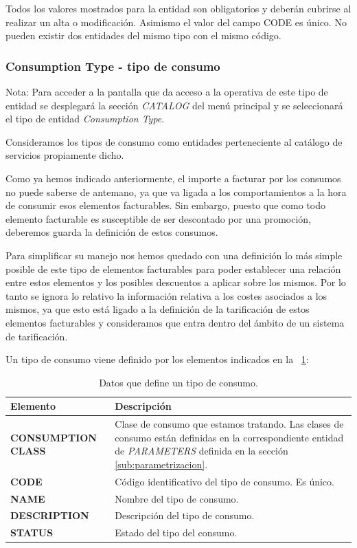 Todos los valores mostrados para la entidad son obligatorios y deberán cubrirse al realizar un alta o modificación. Asimismo el valor del campo CODE es único. No pueden existir dos entidades del mismo tipo con el mismo código.




\subsubsection{Consumption Type - tipo de consumo}
\label{sub:consumption-type}

Nota: Para acceder a la pantalla que da acceso a la operativa de este tipo de entidad se desplegará la sección \emph{CATALOG} del menú principal y se seleccionará el tipo de entidad \emph{Consumption Type}.

Consideramos los tipos de consumo como entidades perteneciente al catálogo de servicios propiamente dicho.

Como ya hemos indicado anteriormente, el importe a facturar por los consumos no puede saberse de antemano, ya que va ligada a los comportamientos a la hora de consumir esos elementos facturables. Sin embargo, puesto que como todo elemento facturable es susceptible de ser descontado por una promoción, deberemos guarda la definición de estos consumos.

Para simplificar su manejo nos hemos quedado con una definición lo más simple posible de este tipo de elementos facturables para poder establecer una relación entre estos elementos y los posibles descuentos a aplicar sobre los mismos. Por lo tanto se ignora lo relativo la información relativa a los costes asociados a los mismos, ya que esto está ligado a la definición de la tarificación de estos elementos facturables y consideramos que entra dentro del ámbito de un sistema de tarificación. 

Un tipo de consumo viene definido por los elementos indicados en la \tablename~\ref{tab:tipo-consumo}:



\begin{table}[H]
  \centering
  \setlength{\leftmargini}{0.4cm}
  \resizebox{14cm}{!} {
  \begin{tabular}{|m{3cm} m{11cm}|}
  \rowcolor{udcpink!25}
  \hline
  	\textbf{Elemento} & \textbf{Descripción} \\\hline
  	\textbf{CONSUMPTION CLASS} & Clase de consumo que estamos tratando. Las clases de consumo están definidas en la correspondiente entidad de \emph{PARAMETERS} definida en la sección \ref{sub:parametrizacion}.   \\
	\textbf{CODE} & Código identificativo del tipo de consumo. Es único.   \\
	\textbf{NAME} & Nombre del tipo de consumo. \\
	\textbf{DESCRIPTION} & Descripción del tipo de consumo. \\		
	\textbf{STATUS} & Estado del tipo del consumo.
	\\\hline
  \end{tabular}
  } %
  \caption{Datos que define un tipo de consumo.}
  \label{tab:tipo-consumo}
\end{table}

